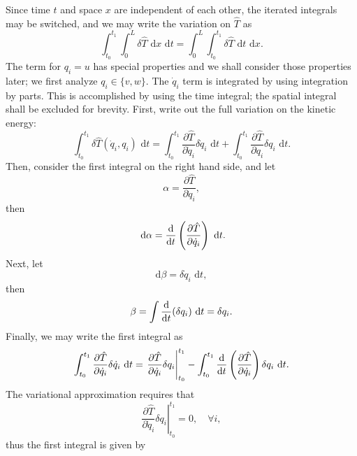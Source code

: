 Since time $t$ and space $x$ are independent of each other, the iterated integrals may be switched, and we may write the variation on $\hat T$ as
\begin{equation}
\int_{t_0}^{t_1}\int_0^L\delta\hat T\text{ d}x\text{ d}t = \int_0^L\int_{t_0}^{t_1}\delta\hat T\text{ d}t\text{ d}x.
\end{equation}
The term for $q_i=u$ has special properties and we shall consider those properties later; we first analyze $q_i\in\{v,w\}$. The $\dot q_i$ term is integrated by using integration by parts. This is accomplished by using the time integral; the spatial integral shall be excluded for brevity.
First, write out the full variation on the kinetic energy:
\begin{equation}
\int_{t_0}^{t_1}\delta\hat T(\dot q_i,q_i)\text{ d}t = \int_{t_0}^{t_1}\frac{\partial\hat T}{\partial \dot q_i}\delta \dot q_i\text{ d}t+\int_{t_0}^{t_1}\frac{\partial\hat T}{\partial q_i}\delta q_i\text{ d}t.
\label{eq:kin.variation}
\end{equation}
Then, consider the first integral on the right hand side, and let
\begin{equation}
\alpha = \frac{\partial\hat T}{\partial \dot q_i},
\end{equation}
then
\begin{equation}
\text{ d}\alpha = \frac{\text d}{\text dt}\left(\frac{\partial\hat T}{\partial \dot q_i}\right)\text{ d}t.
\end{equation}
Next, let
\begin{equation}
\text{d}\beta = \delta \dot q_i\text{ d}t,
\end{equation}
then
\begin{equation}
\beta = \int \frac{\text d}{\text dt}(\delta q_i)\text{ d}t = \delta q_i.
\end{equation}
Finally, we may write the first integral as
\begin{equation}
\int_{t_0}^{t_1}\frac{\partial\hat T}{\partial \dot q_i}\delta \dot q_i\text{ d}t = \left.\frac{\partial\hat T}{\partial \dot q_i}\delta q_i\right |_{t_0}^{t_1}-\int_{t_0}^{t_1}\frac{\text d}{\text dt}\left(\frac{\partial\hat T}{\partial \dot q_i}\right)\delta q_i\text{ d}t.
\end{equation}
The variational approximation requires that
\begin{equation}
\left.\frac{\partial\hat T}{\partial \dot q_i}\delta q_i\right |_{t_0}^{t_1} = 0,\quad\forall i,
\end{equation}
thus the first integral is given by
